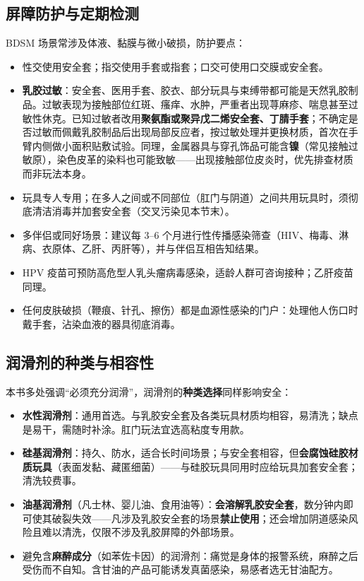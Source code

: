 \documentclass[12pt,UTF8]{ctexbook}
\newcommand{\keyword}[1]{\textbf{#1}}
\begin{document}
\subsection{屏障防护与定期检测}

BDSM 场景常涉及体液、黏膜与微小破损，防护要点：

\begin{itemize}
\item 性交使用安全套；指交使用手套或指套；口交可使用口交膜或安全套。
\item \textbf{乳胶过敏}：安全套、医用手套、胶衣、部分玩具与束缚带都可能是天然乳胶制品。过敏表现为接触部位红斑、瘙痒、水肿，严重者出现荨麻疹、喘息甚至过敏性休克。已知过敏者改用\textbf{聚氨酯或聚异戊二烯安全套、丁腈手套}；不确定是否过敏而佩戴乳胶制品后出现局部反应者，按过敏处理并更换材质，首次在手臂内侧做小面积贴敷试验。同理，金属器具与穿孔饰品可能含\textbf{镍}（常见接触过敏原），染色皮革的染料也可能致敏——出现接触部位皮炎时，优先排查材质而非玩法本身。
\item 玩具专人专用；在多人之间或不同部位（肛门与阴道）之间共用玩具时，须彻底清洁消毒并加套安全套（交叉污染见本节末）。
\item 多伴侣或同好场景：建议每 3--6 个月进行性传播感染筛查（HIV、梅毒、淋病、衣原体、乙肝、丙肝等），并与伴侣互相告知结果。
\item HPV 疫苗可预防高危型人乳头瘤病毒感染，适龄人群可咨询接种；乙肝疫苗同理。
\item 任何皮肤破损（鞭痕、针孔、擦伤）都是血源性感染的门户：处理他人伤口时戴手套，沾染血液的器具彻底消毒。
\end{itemize}

\subsection{润滑剂的种类与相容性}

本书多处强调“必须充分润滑”，润滑剂的\textbf{种类选择}同样影响安全：

\begin{itemize}
\item \textbf{水性润滑剂}：通用首选。与乳胶安全套及各类玩具材质均相容，易清洗；缺点是易干，需随时补涂。肛门玩法宜选高粘度专用款。
\item \textbf{硅基润滑剂}：持久、防水，适合长时间场景；与安全套相容，但\keyword{会腐蚀硅胶材质玩具}（表面发黏、藏匿细菌）——与硅胶玩具同用时应给玩具加套安全套；清洗较费事。
\item \textbf{油基润滑剂}（凡士林、婴儿油、食用油等）：\keyword{会溶解乳胶安全套}，数分钟内即可使其破裂失效——凡涉及乳胶安全套的场景\textbf{禁止使用}；还会增加阴道感染风险且难以清洗，仅限不涉及乳胶屏障的外部场景。
\item 避免含\textbf{麻醉成分}（如苯佐卡因）的润滑剂：痛觉是身体的报警系统，麻醉之后受伤而不自知。含甘油的产品可能诱发真菌感染，易感者选无甘油配方。
\end{itemize}
\end{document}
